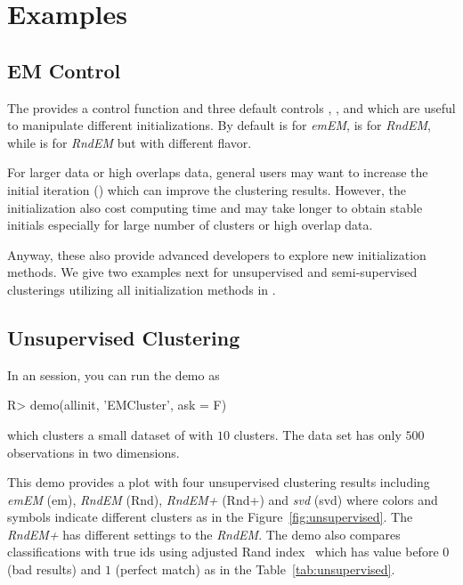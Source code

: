 
\section[Examples]{Examples}
\label{sec:example}


\subsection[EM Control]{EM Control}
\label{sec:emcontrol}

The  provides a control function  and
three default controls , , and 
which are useful to manipulate different initializations.
By default  is for {\it emEM},
 is for {\it RndEM}, while
 is for {\it RndEM} but with different flavor.

For larger data or high overlaps data,
general users may want to increase the initial iteration
()
which can improve the clustering results.
However, the initialization also cost computing time and may take longer
to obtain stable initials especially for large number of clusters or
high overlap data.

Anyway, these also provide advanced developers to explore new initialization
methods.
We give two examples next for unsupervised and semi-supervised clusterings
utilizing all initialization methods in .


\subsection[Unsupervised Clustering]{Unsupervised Clustering}
\label{sec:unsupervised}

In an  session, you can run the demo as
\begin{Code}[title=unsupervised]
R> demo(allinit, 'EMCluster', ask = F)
\end{Code}
which clusters a small dataset  of  with
$10$ clusters. The data set has only $500$ observations in two dimensions.

This demo provides a plot
with four unsupervised clustering results including
{\it emEM} (em), {\it RndEM} (Rnd), {\it RndEM+} (Rnd+)
and {\it svd} (svd) where colors and symbols
indicate different clusters as in the Figure~\ref{fig:unsupervised}.
The {\it RndEM+} has different settings to the {\it RndEM}.
The demo also compares classifications with true ids using adjusted
Rand index~\citep{Hubert1985} which has value before $0$ (bad results)
and $1$ (perfect match) as in the Table~\ref{tab:unsupervised}.

